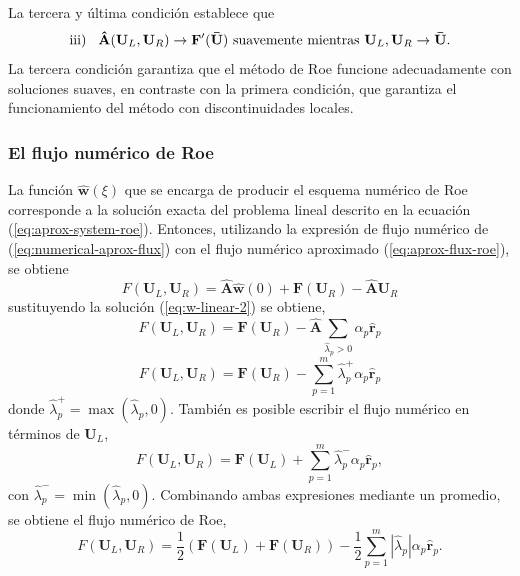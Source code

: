 La tercera y última condición establece que
\begin{equation}
	\text{iii)}\hspace{3mm} \mathbf{\hat{A}}(\mathbf{U}_L, \mathbf{U}_R) \rightarrow \mathbf{F}'(\mathbf{\bar{U}}) \text{ suavemente mientras } \mathbf{{U}}_L, \mathbf{{U}}_R \rightarrow \mathbf{\bar{U}}.
\end{equation}
La tercera condición garantiza que el método de Roe funcione adecuadamente con soluciones suaves, en contraste con la primera condición, que garantiza el funcionamiento del método con discontinuidades locales. 
\subsubsection{El flujo numérico de Roe}
La función $\mathbf{\hat{w}}(\xi)$ que se encarga de producir el esquema numérico de Roe corresponde a la solución exacta del problema lineal descrito en la ecuación (\ref{eq:aprox-system-roe}). Entonces, utilizando la expresión de flujo numérico de (\ref{eq:numerical-aprox-flux}) con el flujo numérico aproximado (\ref{eq:aprox-flux-roe}), se obtiene
\begin{equation}
	F(\mathbf{U}_L, \mathbf{U}_R) = \mathbf{\hat{A}}{\mathbf{\hat{w}}}(0) +  \mathbf{F}(\mathbf{U}_R)-\mathbf{\hat{A}}\mathbf{U}_R
\end{equation}
sustituyendo la solución (\ref{eq:w-linear-2}) se obtiene,
\begin{equation}
	F(\mathbf{U}_L, \mathbf{U}_R) = \mathbf{F}(\mathbf{U}_R) - \mathbf{\hat{A}}\sum_{\hat{\lambda}_p > 0}\alpha_{p} \mathbf{\hat{r}}_{p}
\end{equation}
\begin{equation}
	F(\mathbf{U}_L, \mathbf{U}_R) = \mathbf{F}(\mathbf{U}_R) - \sum_{p=1}^{m} \hat{\lambda}_{p}^{+}\alpha_{p}\mathbf{\hat{r}}_{p}
\end{equation}
donde $\hat{\lambda}_{p}^{+} = \max{(\hat{\lambda}_{p},0)}$. También es posible escribir el flujo numérico en términos de $\mathbf{U}_L$,
\begin{equation}
	F(\mathbf{U}_L, \mathbf{U}_R) = \mathbf{F}(\mathbf{U}_L) + \sum_{p=1}^{m} \hat{\lambda}_{p}^{-}\alpha_{p}\mathbf{\hat{r}}_{p},
\end{equation}
con $\hat{\lambda}_{p}^{-} = \min{(\hat{\lambda}_{p},0)}$. Combinando ambas expresiones mediante un promedio, se obtiene el flujo numérico de Roe,
\begin{equation}
	F(\mathbf{U}_L, \mathbf{U}_R) = \frac{1}{2}\left(\mathbf{F}(\mathbf{U}_L) +\mathbf{F}(\mathbf{U}_R)\right) - 
	\frac{1}{2}\sum_{p=1}^{m}|\hat{\lambda}_{p}|\alpha_{p}\mathbf{\hat{r}}_{p}.
	\label{eq:roe-flux}
\end{equation}
